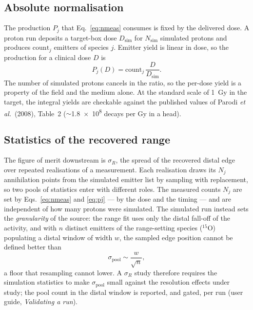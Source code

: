 \documentclass[11pt]{article}
\newcommand{\Ox}[1]{{}^{#1}\mathrm{O}}
\begin{document}
\subsection{Absolute normalisation}
\label{sec:norm}

The production $P_j$ that Eq.~\eqref{eq:nmeas} consumes is fixed by the delivered
dose. A proton run deposits a target-box dose $D_{\mathrm{sim}}$ for
$N_{\mathrm{sim}}$ simulated protons and produces $\mathrm{count}_j$ emitters of
species $j$. Emitter yield is linear in dose, so the production for a clinical dose
$D$ is
\begin{equation}
P_j(D) = \mathrm{count}_j\,\frac{D}{D_{\mathrm{sim}}}.
\label{eq:pj}
\end{equation}
The number of simulated protons cancels in the ratio, so the per-dose yield is a
property of the field and the medium alone. At the standard scale of \SI{1}{Gy} in
the target, the integral yields are checkable against the published values of
Parodi \emph{et al.}\ (2008), Table~2 ($\sim$\SI{1.8e8}{} decays per Gy in a head).

\subsection{Statistics of the recovered range}
\label{sec:pool}

The figure of merit downstream is $\sigma_R$, the spread of the recovered
distal edge over repeated realisations of a measurement. Each realisation
draws its $N_j$ annihilation points from the simulated emitter list by
sampling with replacement, so two pools of statistics enter with different
roles. The measured counts $N_j$ are set by Eqs.~\eqref{eq:nmeas} and
\eqref{eq:pj} --- by the dose and the timing --- and are independent of how
many protons were simulated. The simulated run instead sets the
\emph{granularity} of the source: the range fit uses only the distal fall-off
of the activity, and with $n$ distinct emitters of the range-setting species
($\Ox{15}$) populating a distal window of width $w$, the sampled edge position
cannot be defined better than
\begin{equation}
\sigma_{\mathrm{pool}} \sim \frac{w}{\sqrt{n}},
\label{eq:pool}
\end{equation}
a floor that resampling cannot lower. A $\sigma_R$ study therefore requires
the simulation statistics to make $\sigma_{\mathrm{pool}}$ small against the
resolution effects under study; the pool count in the distal window is
reported, and gated, per run (user guide, \emph{Validating a run}).
\end{document}
